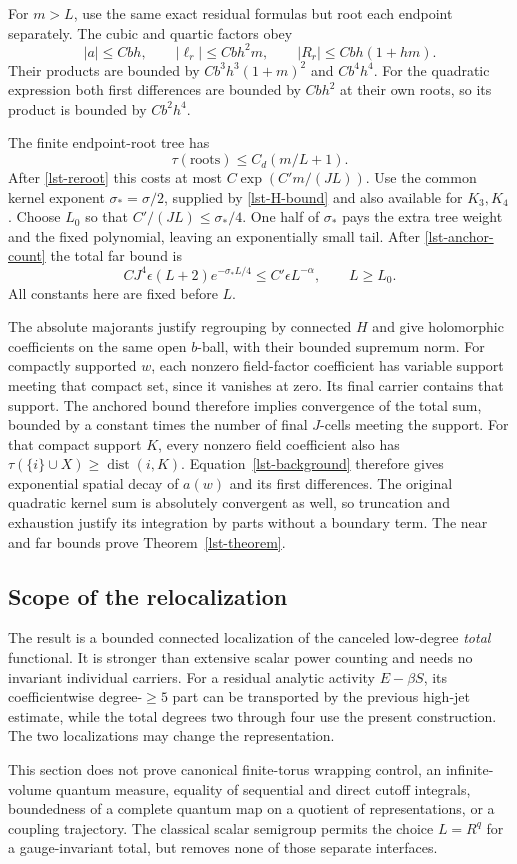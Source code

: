 For \(m>L\), use the same exact residual formulas but
root each endpoint separately. The cubic and quartic
factors obey
\[
 |a|\le Cbh,\qquad
 |\ell_r|\le Cbh^2m,\qquad
 |R_r|\le Cbh(1+hm).
\]
Their products are bounded by
\(Cb^3h^3(1+m)^2\) and \(Cb^4h^4\).
For the quadratic expression both first differences
are bounded by \(Cbh^2\) at their own roots, so its
product is bounded by \(Cb^2h^4\).

The finite endpoint-root tree has
\[
 \tau(\text{roots})\le C_d(m/L+1).
\]
After \eqref{lst-reroot} this costs at most
\(C\exp(C'm/(JL))\). Use the common kernel exponent
\(\sigma_*=\sigma/2\), supplied by \eqref{lst-H-bound}
and also available for \(K_3,K_4\). Choose \(L_0\)
so that \(C'/(JL)\le\sigma_*/4\). One half of
\(\sigma_*\) pays the extra tree weight and the fixed
polynomial, leaving an exponentially small tail.
After \eqref{lst-anchor-count} the total far bound is
\begin{equation}
 CJ^4\epsilon(L+2)e^{-\sigma_*L/4}
                 \le C'\epsilon L^{-\alpha},
       \qquad L\ge L_0 .
 \label{lst-far-bound}
\end{equation}
All constants here are fixed before \(L\).

The absolute majorants justify regrouping by connected
\(H\) and give holomorphic coefficients on the same
open \(b\)-ball, with their bounded supremum norm.
For compactly supported \(w\), each nonzero field-factor
coefficient has variable support meeting that compact
set, since it vanishes at zero. Its final carrier
contains that support. The anchored bound therefore
implies convergence of the total sum, bounded by a
constant times the number of final \(J\)-cells meeting
the support. For that compact support \(K\), every
nonzero field coefficient also has
\(\tau(\{i\}\cup X)\ge\operatorname{dist}(i,K)\).
Equation~\eqref{lst-background} therefore gives
exponential spatial decay of \(a(w)\) and its first
differences. The original quadratic kernel sum is
absolutely convergent as well, so truncation and
exhaustion justify its integration by parts without
a boundary term. The near and far
bounds prove Theorem~\ref{lst-theorem}.

\subsection{Scope of the relocalization}
\label{lst-scope}

The result is a bounded connected localization of
the canceled low-degree \emph{total} functional.
It is stronger than extensive scalar power counting
and needs no invariant individual carriers. For a
residual analytic activity \(E-\beta S\), its
coefficientwise degree-\(\ge5\) part can be transported
by the previous high-jet estimate, while the total
degrees two through four use the present construction.
The two localizations may change the representation.

This section does not prove canonical finite-torus
wrapping control, an infinite-volume quantum measure,
equality of sequential and direct cutoff integrals,
boundedness of a complete quantum map on a quotient
of representations, or a coupling trajectory.
The classical scalar semigroup permits the choice
\(L=R^q\) for a gauge-invariant total, but removes
none of those separate interfaces.
